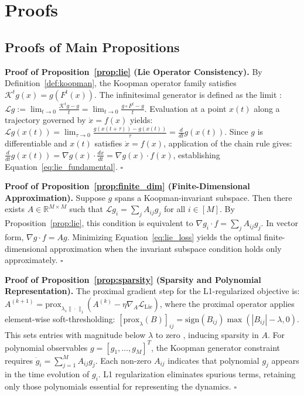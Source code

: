\documentclass{article}
\theoremstyle{remark}
\begin{document}
\FloatBarrier
\section{Proofs}
\label{app:proofs}

\subsection{Proofs of Main Propositions}
\label{app:proofs_main}

\textbf{Proof of Proposition~\ref{prop:lie} (Lie Operator Consistency).}
By Definition~\ref{def:koopman}, the Koopman operator family satisfies $\mathcal{K}^t g(x) = g(F^t(x))$. The infinitesimal generator is defined as the limit \citep{brunton2022modern}:
$\mathcal{L}g := \lim_{t \rightarrow 0} \frac{\mathcal{K}^t g - g}{t} = \lim_{t \rightarrow 0} \frac{g \circ F^t - g}{t}$.
Evaluation at a point $x(t)$ along a trajectory governed by $\dot{x} = f(x)$ yields:
$\mathcal{L}g(x(t)) = \lim_{\tau \rightarrow 0} \frac{g(x(t+\tau)) - g(x(t))}{\tau} = \frac{d}{dt}g(x(t))$.
Since $g$ is differentiable and $x(t)$ satisfies $\dot{x} = f(x)$, application of the chain rule gives:
$\frac{d}{dt}g(x(t)) = \nabla g(x) \cdot \frac{dx}{dt} = \nabla g(x) \cdot f(x)$,
establishing Equation~\ref{eq:lie_fundamental}. $\square$

\textbf{Proof of Proposition~\ref{prop:finite_dim} (Finite-Dimensional Approximation).}
Suppose $g$ spans a Koopman-invariant subspace. Then there exists $A \in \mathbb{R}^{M \times M}$ such that $\mathcal{L}g_i = \sum_j A_{ij}g_j$ for all $i \in [M]$. By Proposition~\ref{prop:lie}, this condition is equivalent to $\nabla g_i \cdot f = \sum_j A_{ij}g_j$. In vector form, $\nabla g \cdot f = Ag$. Minimizing Equation~\ref{eq:lie_loss} yields the optimal finite-dimensional approximation when the invariant subspace condition holds only approximately. $\square$

\textbf{Proof of Proposition~\ref{prop:sparsity} (Sparsity and Polynomial Representation).}
The proximal gradient step for the L1-regularized objective is:
$A^{(k+1)} = \text{prox}_{\lambda_s \|\cdot\|_1}(A^{(k)} - \eta \nabla_A \mathcal{L}_{\text{Lie}})$,
where the proximal operator applies element-wise soft-thresholding: $[\text{prox}_{\lambda}(B)]_{ij} = \text{sign}(B_{ij}) \max(|B_{ij}| - \lambda, 0)$. This sets entries with magnitude below $\lambda$ to zero \citep{brunton2016sindy}, inducing sparsity in $A$.
For polynomial observables $g = [g_1, \ldots, g_M]^T$, the Koopman generator constraint requires $\dot{g}_i = \sum_{j=1}^M A_{ij} g_j$. Each non-zero $A_{ij}$ indicates that polynomial $g_j$ appears in the time evolution of $g_i$. L1 regularization eliminates spurious terms, retaining only those polynomials essential for representing the dynamics. $\square$
\end{document}
